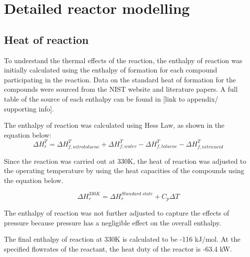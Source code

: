 \section{Detailed reactor modelling}
\subsection{Heat of reaction}
To understand the thermal effects of the reaction, the enthalpy of reaction was initially calculated using the enthalpy of formation for each compound participating in the reaction. Data on the standard heat of formation for the compounds were sourced from the NIST website and literature papers. A full table of the source of each enthalpy can be found in [link to appendix/ supporting info]. 

The enthalpy of reaction was calculated using Hess Law, as shown in the equation below:
\begin{equation}
  \Delta H_{r}^{T} = \Delta H_{f,nitrotoluene}^{T} + \Delta H_{f,water}^{T} - \Delta H_{f,toluene}^{T} - \Delta H_{f,nitric acid}^{T}
\end{equation}

Since the reaction was carried out at 330K, the heat of reaction was adjusted to the operating temperature by using the heat capacities of the compounds using the equation below. 

\begin{equation}
  \Delta H_{r}^{330K} = \Delta H_{r}^{Standard \ state} + C_p \Delta T
\end{equation}

The enthalpy of reaction was not further adjusted to capture the effects of pressure because pressure has a negligible effect on the overall enthalpy.

The final enthalpy of reaction at 330K is calculated to be -116 kJ/mol. At the specified flowrates of the reactant, the heat duty of the reactor is -63.4 kW.

